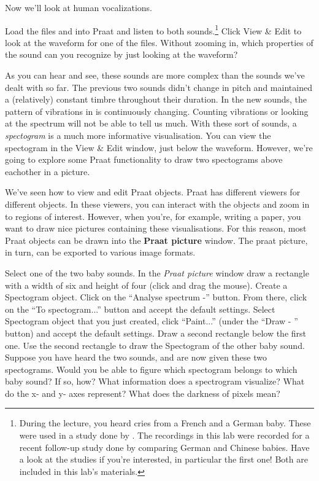 \documentclass[a4paper, 9pt]{article}
\begin{document}
Now we'll look at human vocalizations.

\begin{exercise}
\action Load the files  and  into Praat and listen to both sounds.\footnote{During the lecture, you heard cries from a French and a German baby. These were used in a study done by \cite{Mampe2009}. The recordings in this lab were recorded for a recent follow-up study done by \cite{Wermke2016} comparing German and Chinese babies. Have a look at the studies if you're interested, in particular the first one! Both are included in this lab's materials.}
\action Click View \& Edit to look at the waveform for one of the files. Without zooming in, which properties of the sound can you recognize by just looking at the waveform?
\end{exercise}

As you can hear and see, these sounds are more complex than the sounds
we've dealt with so far. The previous two sounds didn't change in pitch
and maintained a (relatively) constant timbre throughout their duration.
In the new sounds, the pattern of vibrations in is continuously
changing. Counting vibrations or looking at the spectrum will not be
able to tell us much. With these sort of sounds, a \emph{spectogram} is
a much more informative visualisation. You can view the spectogram in
the View \& Edit window, just below the waveform. However, we're going
to explore some Praat functionality to draw two spectograms above
eachother in a picture.

We've seen how to view and edit Praat objects. Praat has different
viewers for different objects. In these viewers, you can interact with
the objects and zoom in to regions of interest. However, when you're,
for example, writing a paper, you want to draw nice pictures containing
these visualisations. For this reason, most Praat objects can be drawn
into the \textbf{Praat picture} window. The praat picture, in turn, can
be exported to various image formats.

\begin{exercise}
\action Select one of the two baby sounds.
\action In the \textit{Praat picture} window draw a rectangle with a width of six and height of four (click and drag the mouse).
\action Create a Spectogram object. Click on the ``Analyse spectrum -'' button. From there, click on the ``To spectogram...'' button and accept the default settings.
\action Select Spectogram object that you just created, click ``Paint...'' (under the ``Draw - '' button) and accept the default settings.
\action Draw a second rectangle below the first one. Use the second rectangle to draw the Spectogram of the other baby sound.
\ask Suppose you have heard the two sounds, and are now given these two spectograms. Would you be able to figure which spectogram belongs to which baby sound? If so, how?
\askstar What information does a spectrogram visualize? What do the x- and y- axes represent? What does the darkness of pixels mean?
\end{exercise}
\end{document}
